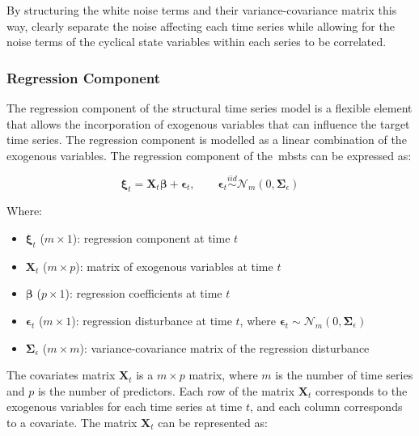     By structuring the white noise terms and their variance-covariance matrix this way,
    clearly separate the noise affecting each time series while allowing for the noise terms of the cyclical
    state variables within each series to be correlated.

\subsubsection{Regression Component}
    \label{sec:regression_component}

    The regression component of the structural time series model is a flexible element that allows the incorporation of
    exogenous variables that can influence the target time series.
    The regression component is modelled as a linear combination of the exogenous variables.
    The regression component of the~\gls{mbsts} can be expressed as:

    \begin{equation}
        \bm{\xi}_{t} = \bm{X}_t \bm{\beta} + \bm{\epsilon}_{t},
            \qquad \bm{\epsilon}_{t} \stackrel{\textit{iid}}{\sim} \mathcal{N}_{m}(0, \bm{\Sigma}_{\epsilon})
        \label{eq:regression_state}
    \end{equation}

    Where:

    \begin{itemize}
        \item $\bm{\xi}_{t}$ ($m \times 1$): regression component at time $t$
        \item $\bm{X}_t$ ($m \times p$): matrix of exogenous variables at time $t$
        \item $\bm{\beta}$ ($p \times 1$): regression coefficients at time $t$
        \item $\bm{\epsilon}_{t}$ ($m \times 1$): regression disturbance at time $t$,
            where $\bm{\epsilon}_{t} \sim \mathcal{N}_{m}(0, \bm{\Sigma}_{\epsilon})$
        \item $\bm{\Sigma}_{\epsilon}$ ($m \times m$): variance-covariance matrix of the regression disturbance
    \end{itemize}

    The covariates matrix $\bm{X}_t$ is a $m \times p$ matrix, where $m$ is the number of time series and $p$ is the number of predictors.
    Each row of the matrix $\bm{X}_t$ corresponds to the exogenous variables for each time series at time $t$,
    and each column corresponds to a covariate. The matrix $\bm{X}_t$ can be represented as:

